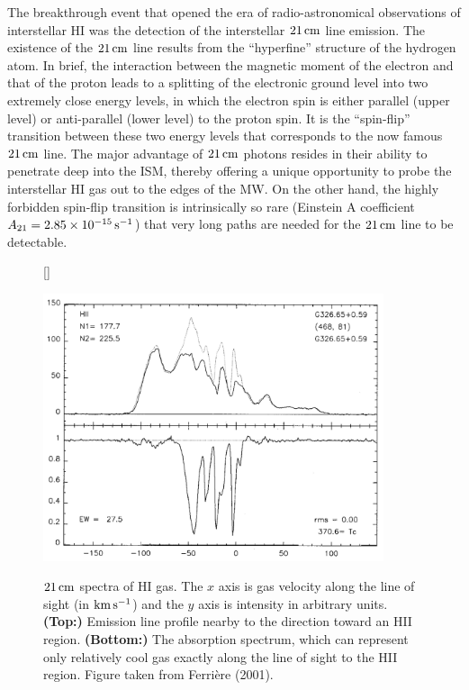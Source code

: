\documentclass[a4paper,10pt]{article}
\begin{document}
{\noindent}The breakthrough event that opened the era of radio-astronomical observations of interstellar HI was the detection of the interstellar $21\,{\rm cm}$ line emission. The existence of the $21\,{\rm cm}$ line results from the ``hyperfine'' structure of the hydrogen atom. In brief, the interaction between the magnetic moment of the electron and that of the proton leads to a splitting of the electronic ground level into two extremely close energy levels, in which the electron spin is either parallel (upper level) or anti-parallel (lower level) to the proton spin. It is the ``spin-flip'' transition between these two energy levels that corresponds to the now famous $21\,{\rm cm}$ line. The major advantage of $21\,{\rm cm}$ photons resides in their ability to penetrate deep into the ISM, thereby offering a unique opportunity to probe the interstellar HI gas out to the edges of the MW. On the other hand, the highly forbidden spin-flip transition is intrinsically so rare (Einstein A coefficient $A_{21}=2.85\times10^{-15}\,{\rm s^{-1}}$) that very long paths are needed for the $21\,{\rm cm}$ line to be detectable.

\begin{figure}[t]
    [\FBwidth]
    {\caption{\footnotesize{$21\,{\rm cm}$ spectra of HI gas. The $x$ axis is gas velocity along the line of sight (in ${\rm km\,s^{-1}}$) and the $y$ axis is intensity in arbitrary units. \textbf{(Top:)} Emission line profile nearby to the direction toward an HII region. \textbf{(Bottom:)} The absorption spectrum, which can represent only relatively cool gas exactly along the line of sight to the HII region. Figure taken from Ferri\`ere (2001).}}
    \label{fig:21cmemissabs}}
    {\includegraphics[width=10cm]{figures/21cm_emission_abs.png}}
\end{figure}
\end{document}
